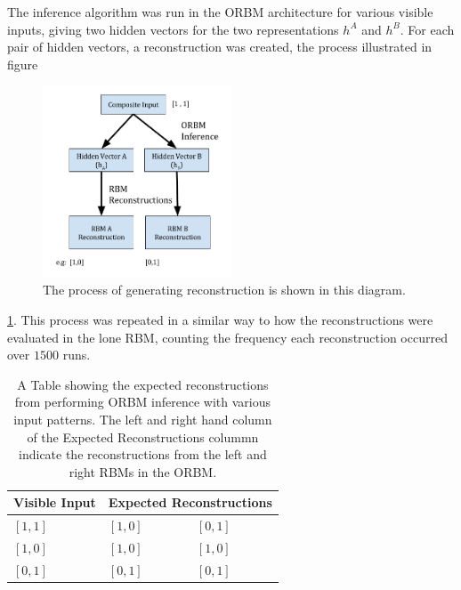 The inference algorithm was run in the ORBM architecture for various visible inputs, giving two hidden vectors for the two representations $h^A$ and $h^B$. For each pair of hidden vectors, a reconstruction was created, the process illustrated in figure
\begin{figure}[h]
  \begin{center}
    \includegraphics[width=0.5\textwidth]{Assets/XOR-2-Bit-Process-Diagram.png}
  \end{center}
  \caption{The process of generating reconstruction is shown in this diagram.}

  \label{F:Two-Bit-ORBM-Process-Diagram}
\end{figure}
 \ref{F:Two-Bit-ORBM-Process-Diagram}. This process was repeated in a similar way to how the reconstructions were evaluated in the lone RBM, counting the frequency each reconstruction occurred over $1500$ runs.

\begin{table}[]
\centering
\begin{tabular}{|l|l|l|}
\hline
Visible Input & \multicolumn{2}{l|}{Expected Reconstructions} \\ \hline
$[1 , 1 ]$    & $[1, 0]$              & $[0,1]$               \\ \hline
$[1, 0 ]$     & $[1,0]$               & $[1, 0]$              \\ \hline
$[0, 1]$      & $[0,1]$               & $[0,1]$               \\ \hline
\end{tabular}
\caption{A Table showing the expected reconstructions from performing ORBM inference with various input patterns. The left and right hand column of the Expected Reconstructions colummn indicate the reconstructions from the left and right RBMs in the ORBM.}
\label{my-label}
\end{table}

